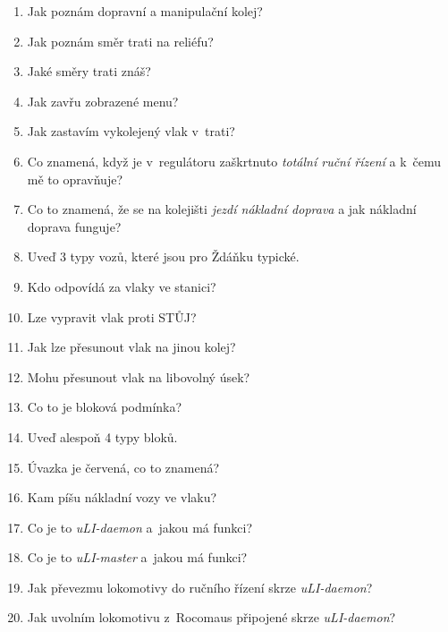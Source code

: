 \documentclass[12pt,a4paper]{article}
\begin{document}
\begin{enumerate}[leftmargin=*]
\item Jak poznám dopravní a manipulační kolej?

\item Jak poznám směr trati na reliéfu?

\item Jaké směry trati znáš?

\item Jak zavřu zobrazené menu?

\item Jak zastavím vykolejený vlak v~trati?

\item Co znamená, když je v~regulátoru zaškrtnuto \textit{totální ruční řízení}
a k~čemu mě to opravňuje?

\item Co to znamená, že se na kolejišti \textit{jezdí nákladní doprava} a jak
nákladní doprava funguje?

\item Uveď 3 typy vozů, které jsou pro Ždáňku typické.

\item Kdo odpovídá za vlaky ve stanici?

\item Lze vypravit vlak proti STŮJ?

\item Jak lze přesunout vlak na jinou kolej?

\item Mohu přesunout vlak na libovolný úsek?

\item Co to je bloková podmínka?

\item Uveď alespoň 4 typy bloků.

\item Úvazka je červená, co to znamená?

\item Kam píšu nákladní vozy ve vlaku?

\item Co je to \textit{uLI-daemon} a~jakou má funkci?

\item Co je to \textit{uLI-master} a~jakou má funkci?

\item Jak převezmu lokomotivy do ručního řízení skrze \textit{uLI-daemon}?

\item Jak uvolním lokomotivu z~Rocomaus připojené skrze \textit{uLI-daemon}?


\end{enumerate}
\end{document}

